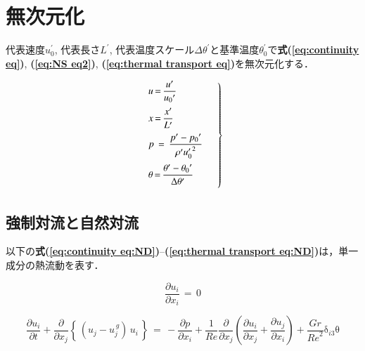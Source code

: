 %
\section{無次元化}
\label{sec:non dimensionalize}
代表速度$u_0^\prime$, 代表長さ$L^\prime$, 代表温度スケール$\Delta \theta^\prime$と基準温度$\theta_0^\prime$で\textbf{式(\ref{eq:continuity eq})}, \textbf{(\ref{eq:NS eq2})}, \textbf{(\ref{eq:thermal transport eq})}を無次元化する．

\begin{equation}
\left.{ \begin{array}{l}
\vspace{2mm}
{u \,{=}\, \displaystyle{ \frac{ u^{\prime} } { {u_{0}}^{\prime}} } }\\
\vspace{2mm}
x \,{=}\, \displaystyle{ \frac{x^{\prime}}{L^{\prime}} }\\
\vspace{2mm}
p \,=\, \displaystyle{ \frac{p^\prime - {p_0}^\prime}{\rho^\prime {u_0^\prime}^2} }\\
\vspace{2mm}
\theta \,{=}\, \displaystyle{ \frac{\theta^{\prime} - {\theta_{0}}^{\prime}}{\Delta \theta^{\prime}} }
\end{array}\quad }\right\}
\label{eq:non dimensional basis}
\end{equation}

%
\subsection{強制対流と自然対流}
\label{sec:natural_convection}
以下の\textbf{式(\ref{eq:continuity eq:ND})}--\textbf{(\ref{eq:thermal transport eq:ND})}は，単一成分の熱流動を表す．

\begin{equation}
\frac{\partial{u}_{i}}{\partial{x}_{i}}\,{=}\,{0}
\label{eq:continuity eq:ND}
\end{equation}

\begin{equation}
\frac{\partial{u}_{i}}{\partial{t}}{+}\frac{\partial}{\partial{x}_{j}} \left\{ \, \left( u_j - u_j^{\,g} \right) \, u_i \, \right\}
\,{=}\,
{-}\frac{\partial{p}}{\partial{x}_{i}}{+}\frac{1}{Re}\frac{\partial}{\partial{x}_{j}}\left({\frac{\partial{u}_{i}}{\partial{x}_{j}}{+}\frac{\partial{u}_{j}}{\partial{x}_{i}}}\right){+}\frac{Gr}{{Re}^{2}}{\mathrm{\delta}}_{i3}\mathrm{\theta}
\label{eq:NS eq:ND}
\end{equation}

